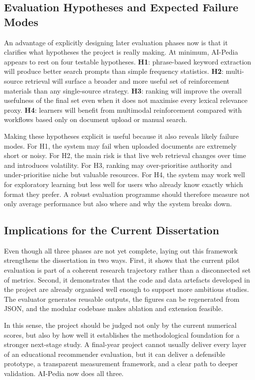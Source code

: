 \documentclass[10pt,journal,compsoc]{IEEEtran}
\begin{document}
\subsection{Evaluation Hypotheses and Expected Failure Modes}

An advantage of explicitly designing later evaluation phases now is that it clarifies what hypotheses the project is really making. At minimum, AI-Pedia appears to rest on four testable hypotheses. \textbf{H1}: phrase-based keyword extraction will produce better search prompts than simple frequency statistics. \textbf{H2}: multi-source retrieval will surface a broader and more useful set of reinforcement materials than any single-source strategy. \textbf{H3}: ranking will improve the overall usefulness of the final set even when it does not maximise every lexical relevance proxy. \textbf{H4}: learners will benefit from multimodal reinforcement compared with workflows based only on document upload or manual search.

Making these hypotheses explicit is useful because it also reveals likely failure modes. For H1, the system may fail when uploaded documents are extremely short or noisy. For H2, the main risk is that live web retrieval changes over time and introduces volatility. For H3, ranking may over-prioritise authority and under-prioritise niche but valuable resources. For H4, the system may work well for exploratory learning but less well for users who already know exactly which format they prefer. A robust evaluation programme should therefore measure not only average performance but also where and why the system breaks down.

\subsection{Implications for the Current Dissertation}

Even though all three phases are not yet complete, laying out this framework strengthens the dissertation in two ways. First, it shows that the current pilot evaluation is part of a coherent research trajectory rather than a disconnected set of metrics. Second, it demonstrates that the code and data artefacts developed in the project are already organised well enough to support more ambitious studies. The evaluator generates reusable outputs, the figures can be regenerated from JSON, and the modular codebase makes ablation and extension feasible.

In this sense, the project should be judged not only by the current numerical scores, but also by how well it establishes the methodological foundation for a stronger next-stage study. A final-year project cannot usually deliver every layer of an educational recommender evaluation, but it can deliver a defensible prototype, a transparent measurement framework, and a clear path to deeper validation. AI-Pedia now does all three.
\end{document}
